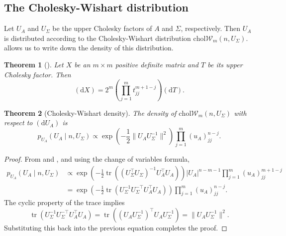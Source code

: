 \documentclass[12pt,a4paper,reqno]{amsart}
\numberwithin{equation}{section}
\newtheorem{theorem}{Theorem}[section]
\newcommand{\cholwishart}[1]{\mathrm{chol}\mathcal{W}_{#1}}
\renewcommand{\det}[1]{\left| {#1} \right|}
\newcommand{\dmeasure}[1]{\left(\dd{#1}\right)}
\newcommand{\dd}[1]{\mathrm{d}{#1}}
\newcommand{\tr}{\operatorname{tr}}
\begin{document}
\subsection*{The Cholesky-Wishart distribution}

Let $U_A$ and $U_\Sigma$ be the upper Cholesky factors of $A$ and $\Sigma$, respectively.
Then $U_A$ is distributed according to the Cholesky-Wishart distribution $\cholwishart{m}(n, U_\Sigma)$.
 allows us to write down the density of this distribution.

\begin{theorem}[{\cite[Theorem 2.1.9]{muirhead_aspects_1982}}]
    Let $X$ be an $m \times m$ positive definite matrix and $T$ be its upper Cholesky factor.
    Then
    \begin{equation}\label{choleskydetjac}
        \dmeasure{X} = 2^m \left(\prod_{j=1}^m t_{jj}^{m+1-j} \right) \dmeasure{T}.
    \end{equation}
\end{theorem}

\begin{theorem}[Cholesky-Wishart density]
    The density of $\cholwishart{m}(n, U_\Sigma)$ with respect to $\dmeasure{U_A} $ is
    \begin{equation}\label{cholwishartdensity}
        p_{U_A}(U_A \mid n, U_\Sigma) \propto \exp\left(-\frac{1}{2}\lVert U_A U_\Sigma^{-1} \rVert^2\right) \prod_{j=1}^m (u_A)_{jj}^{n-j}.
    \end{equation}
\end{theorem}
\begin{proof}
    From  and , and using the change of variables formula,
    \begin{align*}
        p_{U_A}(U_A \mid n, U_\Sigma) & \propto \exp\left(-\frac{1}{2}\tr((U_\Sigma^\top U_\Sigma)^{-1} U_A^\top U_A)\right) \det{U_A}^{n-m-1} \prod_{j=1}^m (u_A)_{jj}^{m+1-j} \\
                                      & = \exp\left(-\frac{1}{2}\tr(U_\Sigma^{-1} U_\Sigma^{-\top} U_A^\top U_A)\right) \prod_{j=1}^m (u_A)_{jj}^{n-j}.
    \end{align*}
    The cyclic property of the trace implies
    \[\tr(U_\Sigma^{-1} U_\Sigma^{-\top} U_A^\top U_A) = \tr((U_A U_\Sigma^{-1})^\top U_A U_\Sigma^{-1}) = \lVert U_A U_\Sigma^{-1} \rVert^2.\]
    Substituting this back into the previous equation completes the proof.
\end{proof}
\end{document}
